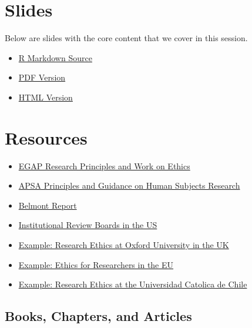 \documentclass[12pt,]{book}
\begin{document}
\hypertarget{slides-8}{%
\section{Slides}\label{slides-8}}

Below are slides with the core content that we cover in this session.

\begin{itemize}
\item
  \href{https://egap.github.io/learningdays-resources/Slides/ethics-slides.Rmd}{R Markdown Source}
\item
  \href{https://egap.github.io/learningdays-resources/Slides/ethics-slides.pdf}{PDF Version}
\item
  \href{https://egap.github.io/learningdays-resources/Slides/ethics-slides.html}{HTML Version}
\end{itemize}

\hypertarget{resources-8}{%
\section{Resources}\label{resources-8}}

\begin{itemize}
\item
  \href{https://egap.org/ethics/}{EGAP Research Principles and Work on Ethics}
\item
  \href{https://connect.apsanet.org/hsr/principles-and-guidance/}{APSA Principles and Guidance on Human Subjects Research}
\item
  \href{https://www.hhs.gov/ohrp/regulations-and-policy/belmont-report/index.html}{Belmont Report}
\item
  \href{https://www.youtube.com/watch?v=U8fme1boEbE}{Institutional Review Boards in the US}
\item
  \href{https://researchsupport.admin.ox.ac.uk/governance/ethics}{Example: Research Ethics at Oxford University in the UK}
\item
  \href{https://ec.europa.eu/research/participants/data/ref/fp7/89888/ethics-for-researchers_en.pdf}{Example: Ethics for Researchers in the EU}
\item
  \href{http://eticayseguridad.uc.cl/}{Example: Research Ethics at the Universidad Catolica de Chile}
\end{itemize}

\hypertarget{books-chapters-and-articles-6}{%
\subsection{Books, Chapters, and Articles}\label{books-chapters-and-articles-6}}
\end{document}

